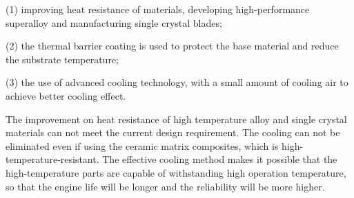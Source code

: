 (1) improving heat resistance of materials, developing high-performance superalloy and manufacturing single crystal blades;

(2) the thermal barrier coating is used to protect the base material and reduce the substrate temperature;

(3) the use of advanced cooling technology, with a small amount of cooling air to achieve better cooling effect.

The improvement on heat resistance of high temperature alloy and single crystal materials can not meet the current design requirement. The cooling can not be eliminated even if using the ceramic matrix composites, which is high-temperature-resistant. The effective cooling method makes it possible that the high-temperature parts are capable of withstanding high operation temperature, so that the engine life will be longer and the reliability will be more higher.

